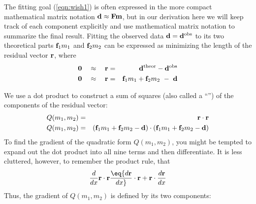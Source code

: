 \par
The fitting goal (\ref{eqn:wish1}) is often expressed in the more compact
mathematical matrix notation ${\bf d}  \approx \bold F   \bold m$,
but in our derivation here
we will keep track of each component explicitly
and use mathematical matrix notation to summarize the final result.
Fitting the observed data $\bold d = \bold d^{\rm obs}$
to its two theoretical parts
          $\bold f_1m_1$ and $\bold f_2m_2$
can be expressed
as minimizing the length of the residual vector $\bold r$, where
\begin{eqnarray}
        \bold 0 \quad\approx\quad
        \bold r &=&  \bold d^{\rm theor} -  \bold d^{\rm obs}
        \\
        \bold 0 \quad\approx\quad
        \bold r &=&  \bold f_1 m_1 + \bold f_2 m_2  \ -\ {\bf d}
        \label{eqn:resdef}
\end{eqnarray}

We use a dot product to construct a sum of squares (also called a ``'')
of the components of the residual vector:
\begin{eqnarray}
Q(m_1,m_2) &=& \bold r \cdot \bold r \\
Q(m_1,m_2) &=&
                   ({\bf f}_1 m_1 + {\bf f}_2 m_2 - {\bf d} )
           \cdot
                   ({\bf f}_1 m_1 + {\bf f}_2 m_2 - {\bf d} )
\label{eqn:allquadratics}
\end{eqnarray}
To find the gradient of the quadratic form $Q(m_1,m_2)$,
you might be tempted to expand out the dot product into all nine terms
and then differentiate.
It is less cluttered, however, to remember the product rule, that
\begin{equation}
{d\over dx} \bold r \cdot \bold r
\eq
{d\bold r \over dx} \cdot \bold r
+
\bold r
\cdot
{d\bold r \over dx}
\end{equation}
Thus, the gradient of $ Q(m_1,m_2)$  is defined by its two components:

